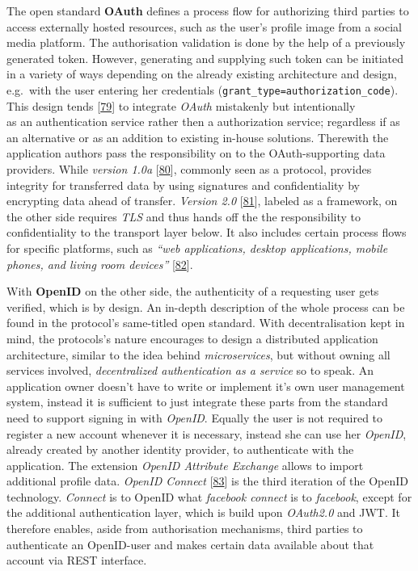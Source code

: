 \documentclass[12pt,english,a4paper,titlepage,cleardoublepage=empty,dottedtoc]{report}
\begin{document}
The open standard \textbf{\protect\hypertarget{link_oauth}{}{OAuth}}
defines a process flow for authorizing third parties to access
externally hosted resources, such as the user's profile image from a
social media platform. The authorisation validation is done by the help
of a previously generated token. However, generating and supplying such
token can be initiated in a variety of ways depending on the already
existing architecture and design, e.g.~with the user entering her
credentials (\texttt{grant\_type=authorization\_code}). This design
tends
{[}\protect\hyperlink{ref-web_2012_problem-with-oauth-for-authentication}{79}{]}
to integrate \emph{OAuth} mistakenly but intentionally\\
as an authentication service rather then a authorization service;
regardless if as an alternative or as an addition to existing in-house
solutions. Therewith the application authors pass the responsibility on
to the OAuth-supporting data providers. While \emph{version 1.0a}
{[}\protect\hyperlink{ref-web_spec_oauth-1a}{80}{]}, commonly seen as a
protocol, provides integrity for transferred data by using signatures
and confidentiality by encrypting data ahead of transfer. \emph{Version
2.0} {[}\protect\hyperlink{ref-web_spec_oauth-2}{81}{]}, labeled as a
framework, on the other side requires \emph{TLS} and thus hands off the
the responsibility to confidentiality to the transport layer below. It
also includes certain process flows for specific platforms, such as
\emph{``web applications, desktop applications, mobile phones, and
living room devices''}
{[}\protect\hyperlink{ref-web_2016_oauth-2}{82}{]}.

With \textbf{OpenID} on the other side, the authenticity of a requesting
user gets verified, which is by design. An in-depth description of the
whole process can be found in the protocol's same-titled open standard.
With decentralisation kept in mind, the protocols's nature encourages to
design a distributed application architecture, similar to the idea
behind \emph{microservices}, but without owning all services involved,
\emph{decentralized authentication as a service} so to speak. An
application owner doesn't have to write or implement it's own user
management system, instead it is sufficient to just integrate these
parts from the standard need to support signing in with \emph{OpenID}.
Equally the user is not required to register a new account whenever it
is necessary, instead she can use her \emph{OpenID}, already created by
another identity provider, to authenticate with the application. The
extension \emph{OpenID Attribute Exchange} allows to import additional
profile data. \emph{OpenID Connect}
{[}\protect\hyperlink{ref-web_spec_openid-connect-1}{83}{]} is the third
iteration of the OpenID technology. \emph{Connect} is to OpenID what
\emph{facebook connect} is to \emph{facebook}, except for the additional
authentication layer, which is build upon \emph{OAuth2.0} and JWT. It
therefore enables, aside from authorisation mechanisms, third parties to
authenticate an OpenID-user and makes certain data available about that
account via REST interface.
\end{document}
